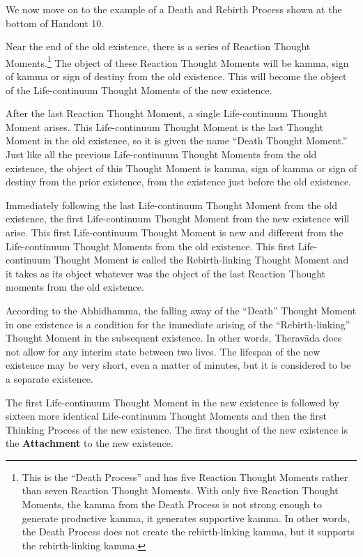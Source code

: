 We now move on to the example of a Death and Rebirth Process shown at the bottom of Handout 10. 

Near the end of the old existence, there is a series of Reaction Thought Moments.\footnote{This is the “Death Process” and has five Reaction Thought Moments rather than seven Reaction Thought Moments. With only five Reaction Thought Moments, the kamma from the Death Process is not strong enough to generate productive kamma, it generates supportive kamma. In other words, the Death Process does not create the rebirth-linking kamma, but it supports the rebirth-linking kamma.} The object of these Reaction Thought Moments will be kamma, sign of kamma or sign of destiny from the old existence. This will become the object of the Life-continuum Thought Moments of the new existence. 

After the last Reaction Thought Moment, a single Life-continuum Thought Moment arises. This Life-continuum Thought Moment is the last Thought Moment in the old existence, so it is given the name “Death Thought Moment.” Just like all the previous Life-continuum Thought Moments from the old existence, the object of this Thought Moment is kamma, sign of kamma or sign of destiny from the prior existence, from the existence just before the old existence.

Immediately following the last Life-continuum Thought Moment from the old existence, the first Life-continuum Thought Moment from the new existence will arise. This first Life-continuum Thought Moment is new and different from the Life-continuum Thought Moments from the old existence. This first Life-continuum Thought Moment is called the Rebirth-linking Thought Moment and it takes as its object whatever was the object of the last Reaction Thought moments from the old existence.

According to the Abhidhamma, the falling away of the “Death” Thought Moment in one existence is a condition for the immediate arising of the “Rebirth-linking” Thought Moment in the subsequent existence. In other words, Theravāda does not allow for any interim state between two lives. The lifespan of the new existence may be very short, even a matter of minutes, but it is considered to be a separate existence.

The first Life-continuum Thought Moment in the new existence is followed by sixteen more identical Life-continuum Thought Moments and then the first Thinking Process of the new existence. The first thought of the new existence is the \textbf{Attachment} to the new existence.

